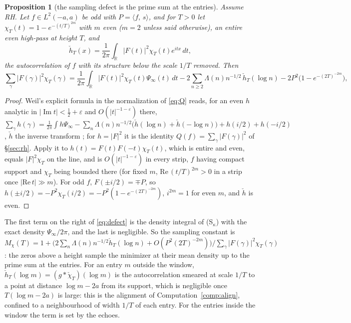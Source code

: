 \documentclass[11pt]{article}
\newtheorem{proposition}[theorem]{Proposition}
\theoremstyle{definition}
\theoremstyle{remark}
\newcommand{\R}{\mathbb{R}}
\newcommand{\ip}[2]{\langle #1,\, #2\rangle}
\DeclareMathOperator{\Imm}{Im}
\begin{document}
\begin{proposition}[the sampling defect is the prime sum at the entries]\label{prop:defect}
Assume RH. Let $f\in L^2(-a,a)$ be odd with $P=\ip fs$, and for $T>0$ let $\chi_T(t)=1-e^{-(t/T)^{2m}}$ with $m$ even ($m=2$ unless said otherwise), an entire even high-pass at height $T$, and
\[
\check h_T(x)=\frac1{2\pi}\int_\R|F(t)|^2\chi_T(t)e^{itx}\,dt ,
\]
the autocorrelation of $f$ with its structure below the scale $1/T$ removed. Then
\begin{equation}\label{eq:defect}
\sum_\gamma|F(\gamma)|^2\chi_T(\gamma)=\frac1{2\pi}\int_\R|F(t)|^2\chi_T(t)\Psi_\infty(t)\,dt-2\sum_{n\ge2}\Lambda(n)n^{-1/2}\,\check h_T(\log n)-2P^2\big(1-e^{-(2T)^{-2m}}\big),
\end{equation}
\end{proposition}
\begin{proof}
Weil's explicit formula in the normalization of \eqref{eq:Q} reads, for an even $h$ analytic in $|\Imm t|<\frac12+\varepsilon$ and $O(|t|^{-1-\varepsilon})$ there, $\sum_\gamma h(\gamma)=\frac1{2\pi}\int h\Psi_\infty-\sum_n\Lambda(n)n^{-1/2}\big(\check h(\log n)+\check h(-\log n)\big)+h(i/2)+h(-i/2)$, $\check h$ the inverse transform \cite{weil,bombieri}; for $h=|F|^2$ it is the identity $Q(f)=\sum_\gamma|F(\gamma)|^2$ of \S\ref{sec:rh}. Apply it to $h(t)=F(t)F(-t)\chi_T(t)$, which is entire and even, equals $|F|^2\chi_T$ on the line, and is $O(|t|^{-1-\varepsilon})$ in every strip, $f$ having compact support and $\chi_T$ being bounded there (for fixed $m$, $\mathrm{Re}\,(t/T)^{2m}>0$ in a strip once $|\mathrm{Re}\,t|\gg m$). For odd $f$, $F(\pm i/2)=\mp P$, so $h(\pm i/2)=-P^2\chi_T(i/2)=-P^2(1-e^{-(2T)^{-2m}})$, $i^{2m}=1$ for even $m$, and $\check h$ is even.
\end{proof}

The first term on the right of \eqref{eq:defect} is the density integral of (S$_\kappa$) with the exact density $\Psi_\infty/2\pi$, and the last is negligible. So the sampling constant is $M_\chi(T)=1+\big(2\sum_n\Lambda(n)n^{-1/2}\check h_T(\log n)+O(P^2(2T)^{-2m})\big)\big/\sum_\gamma|F(\gamma)|^2\chi_T(\gamma)$: the zeros above a height sample the minimizer at their mean density up to the prime sum at the entries. For an entry $m$ outside the window, $\check h_T(\log m)=(g*\check\chi_T)(\log m)$ is the autocorrelation smeared at scale $1/T$ to a point at distance $\log m-2a$ from its support, which is negligible once $T(\log m-2a)$ is large: this is the alignment of Computation~\ref{comp:align}, confined to a neighbourhood of width $1/T$ of each entry. For the entries inside the window the term is set by the echoes.
\end{document}
